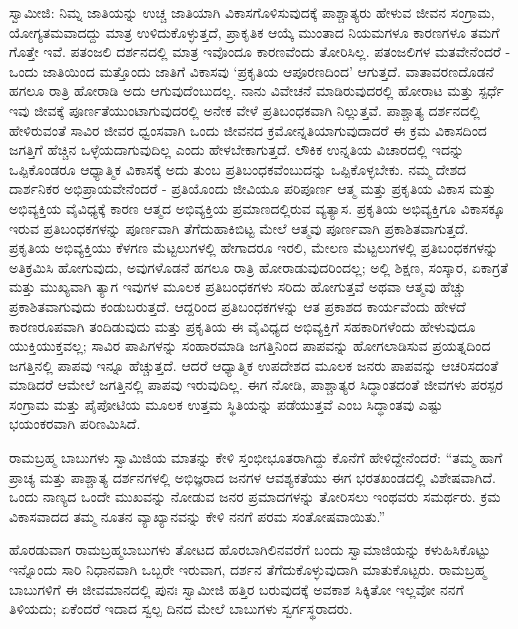 ಸ್ವಾಮೀಜಿ: ನಿಮ್ನ ಜಾತಿಯನ್ನು ಉಚ್ಚ ಜಾತಿಯಾಗಿ ವಿಕಾಸಗೊಳಿಸುವುದಕ್ಕೆ ಪಾಶ್ಚಾತ್ಯರು ಹೇಳುವ ಜೀವನ ಸಂಗ್ರಾಮ, ಯೋಗ್ಯತಮವಾದದ್ದು ಮಾತ್ರ ಉಳಿದುಕೊಳ್ಳುತ್ತದೆ, ಪ್ರಾಕೃತಿಕ ಆಯ್ಕೆ ಮುಂತಾದ ನಿಯಮಗಳೂ ಕಾರಣಗಳೂ ತಮಗೆ ಗೊತ್ತೇ ಇವೆ. ಪತಂಜಲಿ ದರ್ಶನದಲ್ಲಿ ಮಾತ್ರ ಇವೊಂದೂ ಕಾರಣವೆಂದು ತೋರಿಸಿಲ್ಲ. ಪತಂಜಲಿಗಳ ಮತವೇನೆಂದರೆ - ಒಂದು ಜಾತಿಯಿಂದ ಮತ್ತೊಂದು ಜಾತಿಗೆ ವಿಕಾಸವು ‘ಪ್ರಕೃತಿಯ ಆಪೂರಣದಿಂದ’ ಆಗುತ್ತದೆ. ವಾತಾವರಣದೊಡನೆ ಹಗಲೂ ರಾತ್ರಿ ಹೋರಾಡಿ ಅದು ಆಗುವುದೆಂಬುದಲ್ಲ. ನಾನು ವಿವೇಚನೆ ಮಾಡಿರುವುದರಲ್ಲಿ ಹೋರಾಟ ಮತ್ತು ಸ್ಪರ್ಧೆ ಇವು ಜೀವಕ್ಕೆ ಪೂರ್ಣತೆಯುಂಟಾಗುವುದರಲ್ಲಿ ಅನೇಕ ವೇಳೆ ಪ್ರತಿಬಂಧಕವಾಗಿ ನಿಲ್ಲುತ್ತವೆ. ಪಾಶ್ಚಾತ್ಯ ದರ್ಶನದಲ್ಲಿ ಹೇಳಿರುವಂತೆ ಸಾವಿರ ಜೀವರ ಧ್ವಂಸವಾಗಿ ಒಂದು ಜೀವನದ ಕ್ರಮೋನ್ನತಿಯಾಗುವುದಾದರೆ ಈ ಕ್ರಮ ವಿಕಾಸದಿಂದ ಜಗತ್ತಿಗೆ ಹೆಚ್ಚಿನ ಒಳ್ಳೆಯದಾಗುವುದಿಲ್ಲ ಎಂದು ಹೇಳಬೇಕಾಗುತ್ತದೆ. ಲೌಕಿಕ ಉನ್ನತಿಯ ವಿಚಾರದಲ್ಲಿ ಇದನ್ನು ಒಪ್ಪಿಕೊಂಡರೂ ಆಧ್ಯಾತ್ಮಿಕ ವಿಕಾಸಕ್ಕೆ ಅದು ತುಂಬ ಪ್ರತಿಬಂಧಕವೆಂಬುದನ್ನು ಒಪ್ಪಿಕೊಳ್ಳಬೇಕು. ನಮ್ಮ ದೇಶದ ದಾರ್ಶನಿಕರ ಅಭಿಪ್ರಾಯವೇನೆಂದರೆ - ಪ್ರತಿಯೊಂದು ಜೀವಿಯೂ ಪರಿಪೂರ್ಣ ಆತ್ಮ ಮತ್ತು ಪ್ರಕೃತಿಯ ವಿಕಾಸ ಮತ್ತು ಅಭಿವ್ಯಕ್ತಿಯ ವೈವಿಧ್ಯಕ್ಕೆ ಕಾರಣ ಆತ್ಮದ ಅಭಿವ್ಯಕ್ತಿಯ ಪ್ರಮಾಣದಲ್ಲಿರುವ ವ್ಯತ್ಯಾಸ. ಪ್ರಕೃತಿಯ ಅಭಿವ್ಯಕ್ತಿಗೂ ವಿಕಾಸಕ್ಕೂ ಇರುವ ಪ್ರತಿಬಂಧಕಗಳನ್ನು ಪೂರ್ಣವಾಗಿ ತೆಗೆದುಹಾಕಿಬಿಟ್ಟ ಮೇಲೆ ಆತ್ಮವು ಪೂರ್ಣವಾಗಿ ಪ್ರಕಾಶಿತವಾಗುತ್ತದೆ. ಪ್ರಕೃತಿಯ ಅಭಿವ್ಯಕ್ತಿಯು ಕೆಳಗಣ ಮೆಟ್ಟಲುಗಳಲ್ಲಿ ಹೇಗಾದರೂ ಇರಲಿ, ಮೇಲಣ ಮೆಟ್ಟಲುಗಳಲ್ಲಿ ಪ್ರತಿಬಂಧಕಗಳನ್ನು ಅತಿಕ್ರಮಿಸಿ ಹೋಗುವುದು, ಅವುಗಳೊಡನೆ ಹಗಲೂ ರಾತ್ರಿ ಹೋರಾಡುವುದರಿಂದಲ್ಲ; ಅಲ್ಲಿ ಶಿಕ್ಷಣ, ಸಂಸ್ಕಾರ, ಏಕಾಗ್ರತೆ ಮತ್ತು ಮುಖ್ಯವಾಗಿ ತ್ಯಾಗ ಇವುಗಳ ಮೂಲಕ ಪ್ರತಿಬಂಧಕಗಳು ಸರಿದು ಹೋಗುತ್ತವೆ ಅಥವಾ ಆತ್ಮವು ಹೆಚ್ಚು ಪ್ರಕಾಶಿತವಾಗುವುದು ಕಂಡುಬರುತ್ತದೆ. ಆದ್ದರಿಂದ ಪ್ರತಿಬಂಧಕಗಳನ್ನು ಆತ ಪ್ರಕಾಶದ ಕಾರ್ಯವೆಂದು ಹೇಳದೆ ಕಾರಣರೂಪವಾಗಿ ತಂದಿಡುವುದು ಮತ್ತು ಪ್ರಕೃತಿಯ ಈ ವೈವಿಧ್ಯದ ಅಭಿವ್ಯಕ್ತಿಗೆ ಸಹಕಾರಿಗಳೆಂದು ಹೇಳುವುದೂ ಯುಕ್ತಿಯುಕ್ತವಲ್ಲ; ಸಾವಿರ ಪಾಪಿಗಳನ್ನು ಸಂಹಾರಮಾಡಿ ಜಗತ್ತಿನಿಂದ ಪಾಪವನ್ನು ಹೋಗಲಾಡಿಸುವ ಪ್ರಯತ್ನದಿಂದ ಜಗತ್ತಿನಲ್ಲಿ ಪಾಪವು ಇನ್ನೂ ಹೆಚ್ಚುತ್ತದೆ. ಆದರೆ ಆಧ್ಯಾತ್ಮಿಕ ಉಪದೇಶದ ಮೂಲಕ ಜನರು ಪಾಪವನ್ನು ಆಚರಿಸದಂತೆ ಮಾಡಿದರೆ ಆಮೇಲೆ ಜಗತ್ತಿನಲ್ಲಿ ಪಾಪವು ಇರುವುದಿಲ್ಲ. ಈಗ ನೋಡಿ, ಪಾಶ್ಚಾತ್ಯರ ಸಿದ್ಧಾಂತದಂತೆ ಜೀವಗಳು ಪರಸ್ಪರ ಸಂಗ್ರಾಮ ಮತ್ತು ಪೈಪೋಟಿಯ ಮೂಲಕ ಉತ್ತಮ ಸ್ಥಿತಿಯನ್ನು ಪಡೆಯುತ್ತವೆ ಎಂಬ ಸಿದ್ಧಾಂತವು ಎಷ್ಟು ಭಯಂಕರವಾಗಿ ಪರಿಣಮಿಸಿದೆ.

ರಾಮಬ್ರಹ್ಮ ಬಾಬುಗಳು ಸ್ವಾಮಿಜಿಯ ಮಾತನ್ನು ಕೇಳಿ ಸ್ತಂಭೀಭೂತರಾಗಿದ್ದು ಕೊನೆಗೆ ಹೇಳಿದ್ದೇನೆಂದರೆ: “ತಮ್ಮ ಹಾಗೆ ಪ್ರಾಚ್ಯ ಮತ್ತು ಪಾಶ್ಚಾತ್ಯ ದರ್ಶನಗಳಲ್ಲಿ ಅಭಿಜ್ಞರಾದ ಜನಗಳ ಆವಶ್ಯಕತೆಯು ಈಗ ಭರತಖಂಡದಲ್ಲಿ ವಿಶೇಷವಾಗಿದೆ. ಒಂದು ನಾಣ್ಯದ ಒಂದೇ ಮುಖವನ್ನು ನೋಡುವ ಜನರ ಪ್ರಮಾದಗಳನ್ನು ತೋರಿಸಲು ಇಂಥವರು ಸಮರ್ಥರು. ಕ್ರಮ ವಿಕಾಸವಾದದ ತಮ್ಮ ನೂತನ ವ್ಯಾಖ್ಯಾನವನ್ನು ಕೇಳಿ ನನಗೆ ಪರಮ ಸಂತೋಷವಾಯಿತು.”

ಹೊರಡುವಾಗ ರಾಮಬ್ರಹ್ಮಬಾಬುಗಳು ತೋಟದ ಹೊರಬಾಗಿಲಿನವರೆಗೆ ಬಂದು ಸ್ವಾಮಾಜಿಯನ್ನು ಕಳುಹಿಸಿಕೊಟ್ಟು ಇನ್ನೊಂದು ಸಾರಿ ನಿಧಾನವಾಗಿ ಒಬ್ಬರೇ ಇರುವಾಗ, ದರ್ಶನ ತೆಗೆದುಕೊಳ್ಳುವುದಾಗಿ ಮಾತುಕೊಟ್ಟರು. ರಾಮಬ್ರಹ್ಮ ಬಾಬುಗಳಿಗೆ ಈ ಜೀವಮಾನದಲ್ಲಿ ಪುನಃ ಸ್ವಾಮೀಜಿ ಹತ್ತಿರ ಬರುವುದಕ್ಕೆ ಅವಕಾಶ ಸಿಕ್ಕಿತೋ ಇಲ್ಲವೋ ನನಗೆ ತಿಳಿಯದು; ಏಕೆಂದರೆ ಇದಾದ ಸ್ವಲ್ಪ ದಿನದ ಮೇಲೆ ಬಾಬುಗಳು ಸ್ವರ್ಗಸ್ಥರಾದರು.

